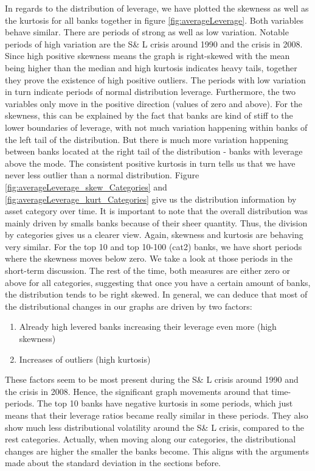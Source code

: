 \documentclass[12pt, a4paper]{article} %
\begin{document}
In regards to the distribution of leverage, we have plotted the skewness as well as the kurtosis for all banks together in figure \ref{fig:averageLeverage}. Both variables behave similar. There are periods of strong as well as low variation. Notable periods of high variation are the S\& L crisis around 1990 and the crisis in 2008. Since high positive skewness means the graph is right-skewed with the mean being higher than the median and high kurtosis indicates heavy tails, together they prove the existence of high positive outliers. The periods with low variation in turn indicate periods of normal distribution leverage. Furthermore, the two variables only move in the positive direction (values of zero and above). For the skewness, this can be explained by the fact that banks are kind of stiff to the lower boundaries of leverage, with not much variation happening within banks of the left tail of the distribution. But there is much more variation happening between banks located at the right tail of the distribution - banks with leverage above the mode. The consistent positive kurtosis in turn tells us that we have never less outlier than a normal distribution. 
Figure \ref{fig:averageLeverage_skew_Categories} and \ref{fig:averageLeverage_kurt_Categories} give us the distribution information by asset category over time. It is important to note that the overall distribution was mainly driven by smalls banks because of their sheer quantity. Thus, the division by categories gives us a clearer view. Again, skewness and kurtosis are behaving very similar. For the top 10 and top 10-100 (cat2) banks, we have short periods where the skewness moves below zero. We take a look at those periods in the short-term discussion. The rest of the time, both measures are either zero or above for all categories, suggesting that once you have a certain amount of banks, the distribution tends to be right skewed. 
In general, we can deduce that most of the distributional changes in our graphs are driven by two factors:
\begin{enumerate}
\item Already high levered banks increasing their leverage even more (high skewness)
\item Increases of outliers (high kurtosis)
\end{enumerate}
These factors seem to be most present during the S\& L crisis around 1990 and the crisis in 2008. Hence, the significant graph movements around that time-periods.
The top 10 banks have negative kurtosis in some periods, which just means that their leverage ratios became really similar in these periods. They also show much less distributional volatility around the S\& L crisis, compared to the rest categories.   Actually, when moving along our categories, the distributional changes are higher the smaller the banks become. This aligns with the arguments made about the standard deviation in the sections before. 
\end{document}
